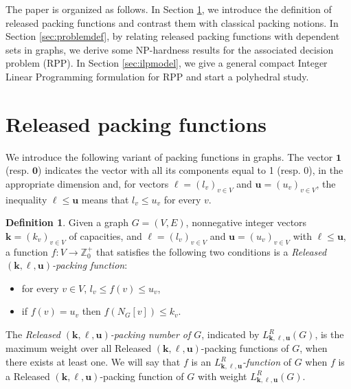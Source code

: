 \documentclass[preprint,12pt]{article}
\renewcommand{\leq}{\leqslant}
\theoremstyle{definition}
\newtheorem{definition}{Definition}[section]
\begin{document}
The paper is organized as follows. In Section \ref{sec:def}, we introduce the definition of released packing functions and contrast them with classical packing notions. In Section \ref{sec:problemdef},  by relating released packing functions with dependent sets in graphs, we derive some NP-hardness results for  the associated decision problem (RPP). In Section \ref{sec:ilpmodel}, we give  a general compact Integer Linear Programming formulation for RPP and start a polyhedral study.


\section{Released packing functions}\label{sec:def}

We introduce the following variant of packing functions in graphs. The vector $\mathbf{1}$ (resp. $\mathbf{0}$) indicates the vector with all its components equal to 1 (resp. 0), in the appropriate dimension and, for vectors  $\boldsymbol\ell=(l_v)_{v\in V}$ and $\mathbf{u}=(u_v)_{v\in V}$, the inequality  $\boldsymbol\ell \leq \mathbf{u}$ means that $l_v \leq  u_v$ for every $v$.




\begin{definition}\label{def:Releasedpacking}
Given a graph $G=(V,E)$,  nonnegative integer vectors  $\mathbf{k}=(k_v)_{v\in V}$ of capacities, and $\boldsymbol\ell=(l_v)_{v\in V}$ and $\mathbf{u}=(u_v)_{v\in V}$ with $\boldsymbol\ell \leq \mathbf{u}$, a function $f : V \rightarrow \mathbb{Z}_0^+$ that satisfies the following two conditions is a  \emph{Released  $(\mathbf{k}, \boldsymbol\ell, \mathbf{u})$-packing function}: 

\begin{itemize}
    \item[i.] for every $v\in V$, $l_v\leq f(v)\leq u_v$,
    \item[ii.] if $f(v) =u_v$ then $f(N_G[v])\leq k_v$.
\end{itemize}
The \emph{Released  $(\mathbf{k}, \boldsymbol\ell, \mathbf{u})$-packing number of $G$}, indicated by $L^R_{\mathbf{k},\boldsymbol\ell,\mathbf{u}}(G)$, is the maximum weight over all Released  $(\mathbf{k}, \boldsymbol\ell, \mathbf{u})$-packing functions of $G$, when there exists at least one. We will say that $f$ is an \emph{$L^R_{\mathbf{k},\boldsymbol\ell,\mathbf{u}}$-function } of $G$ when $f$ is a  Released  $(\mathbf{k}, \boldsymbol\ell, \mathbf{u})$-packing function of $G$ with  weight $L^R_{\mathbf{k},\boldsymbol\ell,\mathbf{u}}(G)$. 
\end{definition}
\end{document}
